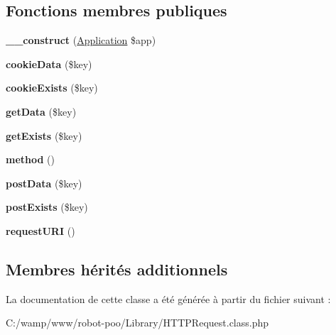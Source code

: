 \subsection*{Fonctions membres publiques}
\begin{DoxyCompactItemize}
\item 
\hypertarget{class_library_1_1_h_t_t_p_request_a2649bea9628906af84eedc23f383af8e}{{\bfseries \+\_\+\+\_\+construct} (\hyperlink{class_library_1_1_application}{Application} \$app)}\label{class_library_1_1_h_t_t_p_request_a2649bea9628906af84eedc23f383af8e}

\item 
\hypertarget{class_library_1_1_h_t_t_p_request_a944c44192cd7530822657c8541389012}{{\bfseries cookie\+Data} (\$key)}\label{class_library_1_1_h_t_t_p_request_a944c44192cd7530822657c8541389012}

\item 
\hypertarget{class_library_1_1_h_t_t_p_request_a60643350bcbd9a22065e71e903f22c05}{{\bfseries cookie\+Exists} (\$key)}\label{class_library_1_1_h_t_t_p_request_a60643350bcbd9a22065e71e903f22c05}

\item 
\hypertarget{class_library_1_1_h_t_t_p_request_ad794ef828353b5288ad528e28c724162}{{\bfseries get\+Data} (\$key)}\label{class_library_1_1_h_t_t_p_request_ad794ef828353b5288ad528e28c724162}

\item 
\hypertarget{class_library_1_1_h_t_t_p_request_aeacbbecf7d7300a970e61cf32d363a32}{{\bfseries get\+Exists} (\$key)}\label{class_library_1_1_h_t_t_p_request_aeacbbecf7d7300a970e61cf32d363a32}

\item 
\hypertarget{class_library_1_1_h_t_t_p_request_a1496a05128f40913fc6e81af4414c461}{{\bfseries method} ()}\label{class_library_1_1_h_t_t_p_request_a1496a05128f40913fc6e81af4414c461}

\item 
\hypertarget{class_library_1_1_h_t_t_p_request_a9e92ce6dba3770e54250801a0dbbeb3b}{{\bfseries post\+Data} (\$key)}\label{class_library_1_1_h_t_t_p_request_a9e92ce6dba3770e54250801a0dbbeb3b}

\item 
\hypertarget{class_library_1_1_h_t_t_p_request_aff2f2ea42e34e0b3cf0353a7ed094e5a}{{\bfseries post\+Exists} (\$key)}\label{class_library_1_1_h_t_t_p_request_aff2f2ea42e34e0b3cf0353a7ed094e5a}

\item 
\hypertarget{class_library_1_1_h_t_t_p_request_a1c6e6fbb2abad8bb3c3b6fb913831f97}{{\bfseries request\+U\+R\+I} ()}\label{class_library_1_1_h_t_t_p_request_a1c6e6fbb2abad8bb3c3b6fb913831f97}

\end{DoxyCompactItemize}
\subsection*{Membres hérités additionnels}


La documentation de cette classe a été générée à partir du fichier suivant \+:\begin{DoxyCompactItemize}
\item 
C\+:/wamp/www/robot-\/poo/\+Library/H\+T\+T\+P\+Request.\+class.\+php\end{DoxyCompactItemize}

